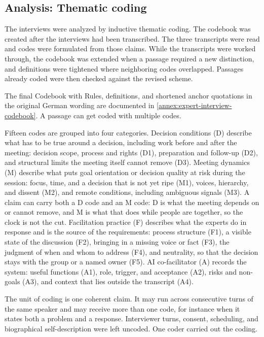 \subsection{Analysis: Thematic coding}
\label{sec:interview-coding}

The interviews were analyzed by inductive thematic coding.
The codebook was created after the interviews had been transcribed.
The three transcripts were read and codes were formulated from those claims.
While the transcripts were worked through, the codebook was extended when a passage required a new
distinction, and definitions were tightened where neighboring codes overlapped.
Passages already coded were then checked against the revised scheme.

The final Codebook with Rules, definitions, and shortened anchor quotations in the original German wording
are documented in \autoref{annex:expert-interview-codebook}. A passage can get coded with multiple codes.

Fifteen codes are grouped into four categories. Decision conditions (D) describe what has to be true around a
decision, including work before and after the meeting: decision scope, process and rights (D1), preparation and
follow-up (D2), and
structural limits the meeting itself cannot remove (D3).
Meeting dynamics (M) describe what puts goal orientation or decision quality at risk during the
session: focus, time, and a decision that is not yet ripe (M1), voices, hierarchy, and dissent
(M2), and remote conditions, including ambiguous signals (M3).
A claim can carry both a D code and an M code: D is what the meeting depends on or cannot remove,
and M is what that does while people are together, so the clock is not the cut.
Facilitation practice (F) describes what the experts do in response and is the source of the
requirements: process structure (F1), a visible state of the discussion (F2), bringing in a missing
voice or fact (F3), the judgment of when and whom to address (F4), and neutrality, so that the
decision stays with the group or a named owner (F5).
AI co-facilitator (A) records the system: useful functions (A1), role, trigger, and acceptance
(A2), risks and non-goals (A3), and context that lies outside the transcript (A4).

The unit of coding is one coherent claim.
It may run across consecutive turns of the same speaker and may receive more than one code, for
instance when it states both a problem and a response.
Interviewer turns, consent, scheduling, and biographical self-description were left uncoded.
One coder carried out the coding.
